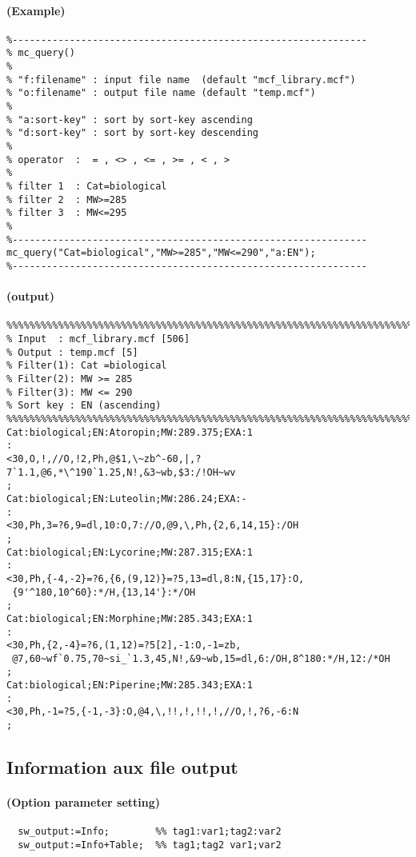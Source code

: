 \documentclass[a4paper]{article}
\begin{document}
\paragraph{(Example)}
\begin{verbatim}
%--------------------------------------------------------------
% mc_query()
%
% "f:filename" : input file name  (default "mcf_library.mcf")
% "o:filename" : output file name (default "temp.mcf")
%
% "a:sort-key" : sort by sort-key ascending
% "d:sort-key" : sort by sort-key descending
%
% operator  :  = , <> , <= , >= , < , >
%
% filter 1  : Cat=biological
% filter 2  : MW>=285
% filter 3  : MW<=295
%
%--------------------------------------------------------------
mc_query("Cat=biological","MW>=285","MW<=290","a:EN");
%--------------------------------------------------------------
\end{verbatim}
\paragraph{(output)}
\begin{verbatim}
%%%%%%%%%%%%%%%%%%%%%%%%%%%%%%%%%%%%%%%%%%%%%%%%%%%%%%%%%%%%%%%%%%%%%%%%%%%%%%%
% Input  : mcf_library.mcf [506]
% Output : temp.mcf [5]
% Filter(1): Cat =biological
% Filter(2): MW >= 285
% Filter(3): MW <= 290
% Sort key : EN (ascending)
%%%%%%%%%%%%%%%%%%%%%%%%%%%%%%%%%%%%%%%%%%%%%%%%%%%%%%%%%%%%%%%%%%%%%%%%%%%%%%%
Cat:biological;EN:Atoropin;MW:289.375;EXA:1
:
<30,O,!,//O,!2,Ph,@$1,\~zb^-60,|,?7`1.1,@6,*\^190`1.25,N!,&3~wb,$3:/!OH~wv 
;
Cat:biological;EN:Luteolin;MW:286.24;EXA:-
:
<30,Ph,3=?6,9=dl,10:O,7://O,@9,\,Ph,{2,6,14,15}:/OH
;
Cat:biological;EN:Lycorine;MW:287.315;EXA:1
:
<30,Ph,{-4,-2}=?6,{6,(9,12)}=?5,13=dl,8:N,{15,17}:O,
 {9'^180,10^60}:*/H,{13,14'}:*/OH
;
Cat:biological;EN:Morphine;MW:285.343;EXA:1
:
<30,Ph,{2,-4}=?6,(1,12)=?5[2],-1:O,-1=zb,
 @7,60~wf`0.75,70~si_`1.3,45,N!,&9~wb,15=dl,6:/OH,8^180:*/H,12:/*OH
;
Cat:biological;EN:Piperine;MW:285.343;EXA:1
:
<30,Ph,-1=?5,{-1,-3}:O,@4,\,!!,!,!!,!,//O,!,?6,-6:N
;
\end{verbatim}
\noindent%
\newpage
\subsection{Information aux file output}
\paragraph{(Option parameter setting)}
%
%
%
%
%
%
%
%
%
%
%
%
%
%
%
%
%
\begin{verbatim}
  sw_output:=Info;        %% tag1:var1;tag2:var2
  sw_output:=Info+Table;  %% tag1;tag2 var1;var2
\end{verbatim}
\end{document}
